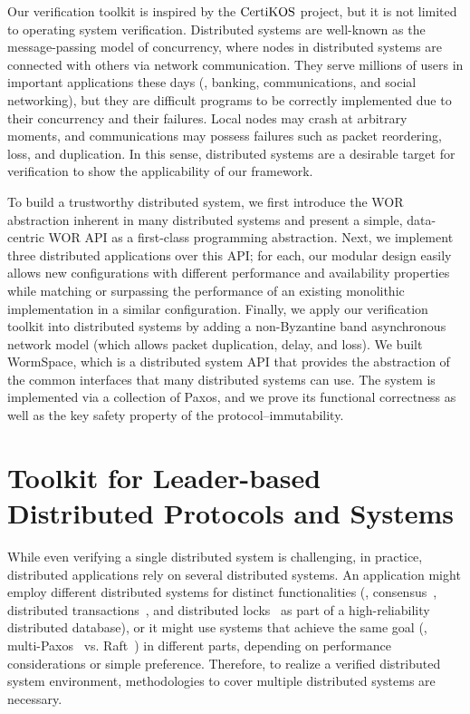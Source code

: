 Our verification toolkit is inspired by the $\mathrm{CertiKOS}$ project, but it is not limited to operating system verification. 
Distributed systems are well-known as the message-passing model of concurrency, where nodes in distributed systems are connected with 
others via network communication. They serve millions of users in important applications
 these days (\ie, banking, communications, and social networking), but they are difficult programs to be correctly implemented 
 due to their concurrency and their failures. Local nodes may crash at arbitrary moments, and communications may possess failures 
 such as packet reordering, loss, and duplication. In this sense, distributed systems are a desirable target for verification to 
 show the applicability of our framework.

To build a trustworthy distributed system, we first introduce the WOR abstraction inherent in many distributed systems and present a simple, 
data-centric WOR API as a first-class programming abstraction.  
Next, we implement three distributed applications over this API; for each, our modular design easily allows new configurations 
with different performance and availability properties while matching or surpassing the performance of an existing monolithic implementation 
in a similar configuration. Finally, we apply our verification toolkit into distributed systems by adding a 
non-Byzantine band asynchronous network model (which allows packet duplication, delay, and loss). We built WormSpace, 
which is a distributed system API that provides the abstraction of the common interfaces that many distributed systems can use. 
The system is implemented via a collection of Paxos, and we prove its functional correctness as well as the key safety property of the 
protocol--immutability.


\section{Toolkit for Leader-based Distributed Protocols and Systems}
\label{chapter:introduction:sec:toolkit-for-leader-based-distributed-protocols-and-systems}


While even verifying a single distributed system is challenging, in practice, distributed applications 
rely on several distributed systems. An application might employ different distributed systems for distinct functionalities (\eg,
consensus~\cite{vivaladifference}, distributed transactions~\cite{gray:2006},
and distributed locks~\cite{chubby, zookeeper} as part of a high-reliability distributed database),
or it might use systems that achieve the same goal 
 (\eg,
multi-Paxos~\cite{paxosmadesimple, rvrpaxos} vs. Raft~\cite{raft}) in different parts, depending on performance considerations or simple preference.
 Therefore, to realize a verified distributed system environment, methodologies to cover multiple distributed systems are necessary.

